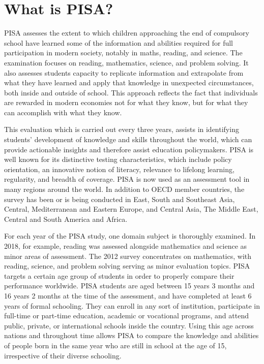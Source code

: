 \hypertarget{what-is-pisa}{%
\section{What is PISA?}\label{what-is-pisa}}

PISA assesses the extent to which children approaching the end of
compulsory school have learned some of the information and abilities
required for full participation in modern society, notably in maths,
reading, and science. The examination focuses on reading, mathematics,
science, and problem solving. It also assesses students capacity to
replicate information and extrapolate from what they have learned and
apply that knowledge in unexpected circumstances, both inside and
outside of school. This approach reflects the fact that individuals are
rewarded in modern economies not for what they know, but for what they
can accomplish with what they know.

This evaluation which is carried out every three years, assists in
identifying students' development of knowledge and skills throughout the
world, which can provide actionable insights and therefore assist
education policymakers. PISA is well known for its distinctive testing
characteristics, which include policy orientation, an innovative notion
of literacy, relevance to lifelong learning, regularity, and breadth of
coverage. PISA is now used as an assessment tool in many regions around
the world. In addition to OECD member countries, the survey has been or
is being conducted in East, South and Southeast Asia, Central,
Mediterranean and Eastern Europe, and Central Asia, The Middle East,
Central and South America and Africa.

For each year of the PISA study, one domain subject is thoroughly
examined. In 2018, for example, reading was assessed alongside
mathematics and science as minor areas of assessment. The 2012 survey
concentrates on mathematics, with reading, science, and problem solving
serving as minor evaluation topics. PISA targets a certain age group of
students in order to properly compare their performance worldwide. PISA
students are aged between 15 years 3 months and 16 years 2 months at the
time of the assessment, and have completed at least 6 years of formal
schooling. They can enroll in any sort of institution, participate in
full-time or part-time education, academic or vocational programs, and
attend public, private, or international schools inside the country.
Using this age across nations and throughout time allows PISA to compare
the knowledge and abilities of people born in the same year who are
still in school at the age of 15, irrespective of their diverse
schooling.

